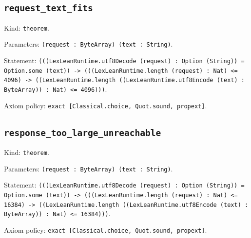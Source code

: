 \documentclass[11pt]{article}
\begin{document}
\subsection*{\texttt{request\_text\_fits}}
\noindent Kind: \texttt{theorem}.\par
\noindent Parameters: \texttt{(request : ByteArray) (text : String)}.\par
\noindent Statement: \texttt{(((LexLeanRuntime.utf8Decode (request) : Option (String)) = Option.some (text)) -> (((LexLeanRuntime.length (request) : Nat) <= 4096) -> ((LexLeanRuntime.length ((LexLeanRuntime.utf8Encode (text) : ByteArray)) : Nat) <= 4096)))}.\par
\noindent Axiom policy: \texttt{exact [Classical.choice, Quot.sound, propext]}.\par
\subsection*{\texttt{response\_too\_large\_unreachable}}
\noindent Kind: \texttt{theorem}.\par
\noindent Parameters: \texttt{(request : ByteArray) (text : String)}.\par
\noindent Statement: \texttt{(((LexLeanRuntime.utf8Decode (request) : Option (String)) = Option.some (text)) -> (((LexLeanRuntime.length (request) : Nat) <= 16384) -> ((LexLeanRuntime.length ((LexLeanRuntime.utf8Encode (text) : ByteArray)) : Nat) <= 16384)))}.\par
\noindent Axiom policy: \texttt{exact [Classical.choice, Quot.sound, propext]}.\par
\end{document}
